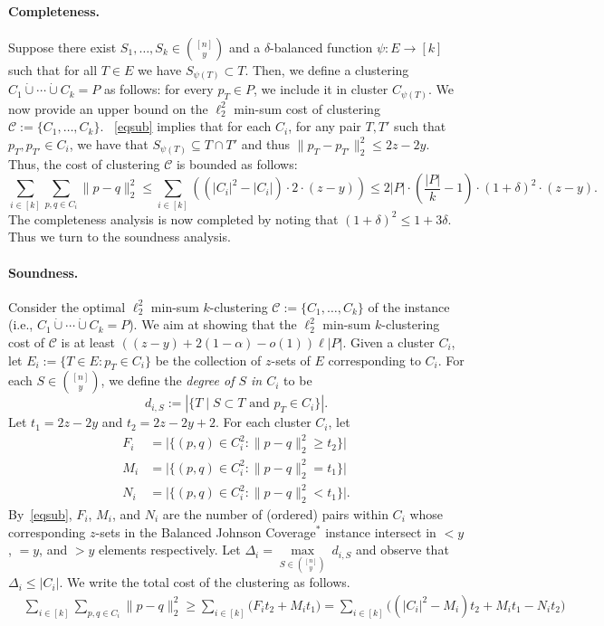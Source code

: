 \documentclass[11pt]{article}
\newcommand{\jcdb}{Balanced Johnson Coverage$^*$\xspace}
\newcommand{\C}{\mathcal{C}}
\begin{document}
\paragraph{Completeness.}
Suppose there exist $S_1,\ldots ,S_k\in \binom{[n]}{y}$   and a $\delta$-balanced function $\psi:E\to [k]$ such that for all $T\in E$ we have $S_{\psi(T)}\subset T$. 
Then, we define a clustering $C_1\dot\cup\cdots\dot\cup C_k=P$  as follows: for every $p_T\in P$, we  include it in cluster $C_{\psi(T)}$.
We now provide an upper bound on the $\ell_2^2$ min-sum cost of clustering $\mathcal{C}:=\{C_1,\ldots ,C_k\}$.
~\eqref{eqsub} implies that for each $C_i$, for any pair $T, T'$ such that
$p_T,p_{T'} \in C_i$, we have that $S_{\psi(T)}\subseteq T\cap T'$ and thus $\|p_T - p_{T'} \|^2_2 \le 2z-2y$.
Thus, the cost of clustering $\C$ is bounded as follows:
$$\sum_{i\in[k]}\sum_{p,q\in C_i}\|p-q\|_2^2\le \sum_{i\in[k]}\left(\left(|C_i|^2-|C_i|\right)\cdot 2\cdot (z-y)\right)\le 2|P|\cdot \left(\frac{|P|}{k}-1\right)\cdot (1+\delta)^2\cdot (z-y).$$
The completeness analysis is now completed by noting that $(1+\delta)^2\le 1+3\delta$. Thus we turn to the soundness analysis.








\paragraph{Soundness.}
Consider the optimal $\ell_2^2$ min-sum $k$-clustering $\mathcal{C}:=\{C_1,\ldots ,C_k\}$ of the instance (i.e., $C_1\dot\cup\cdots\dot\cup C_k=P$). 
We aim at showing that the $\ell_2^2$ min-sum $k$-clustering cost of $\C$ is at
least $((z-y) + 2(1 - \alpha) - o(1))\ell |P|$. Given a cluster $C_i$,
let $E_i := \{ T \in E : p_T\in C_i \}$ be the collection of $z$-sets of $E$ corresponding to $C_i$. 
For each
$S \in \binom{[n]}{y}$, we define the \emph{degree of $S$ in $C_i$} to be 
\[d_{i, S} := \left|\{T \mid S \subset T \text{ and } p_T \in C_i\}\right|.\]
Let $t_1 = 2z - 2y$ and $t_2 = 2z - 2y + 2$. 
For each cluster $C_i$, let
\begin{align*}
F_i &= \bigg| \{ (p, q) \in C_i^2 : \| p - q \|_2^2 \geq t_2 \} \bigg| \\
M_i &= \bigg| \{ (p, q) \in C_i^2 : \| p - q \|_2^2=t_1  \} \bigg| \\
N_i &= \bigg| \{ (p, q) \in C_i^2 : \| p - q \|_2^2 < t_1  \} \bigg|.
\end{align*}
By~\eqref{eqsub}, $F_i$, $M_i$, and $N_i$ are the number of (ordered) pairs within $C_i$ whose corresponding $z$-sets in the \jcdb instance intersect in $<y$, $=y$, and $>y$ elements respectively. 
Let $\Delta_i=\underset{S\in\binom{[n]}{y} }{\max}\ d_{i,S}$ and observe that $\Delta_i\le|C_i|$. 
We write the total cost of the clustering as follows.
\begin{align}
& \sum_{i\in[k]}\sum_{p,q\in C_i}\|p-q\|_2^2 
\geq  \sum_{i\in[k]}  \bigg( F_i t_2 + M_i t_1 \bigg)   
= \sum_{i\in[k]}  \bigg( (|C_i|^2 - M_i) t_2 + M_i t_1 - N_i t_2 \bigg)
\label{eq:cost}
\end{align}
\end{document}
